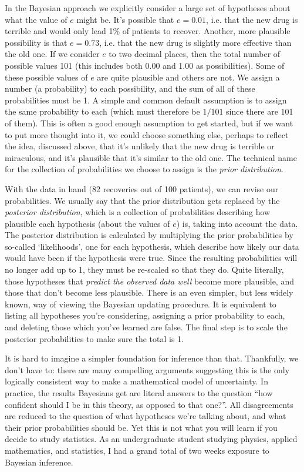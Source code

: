 \documentclass[a4paper, 12pt]{article}
\begin{document}
In the Bayesian approach we explicitly consider a large set of hypotheses about
what the value of $e$ might be. It's possible that $e=0.01$, i.e. that the new
drug is terrible and would only lead 1\% of patients to recover.
Another, more plausible possibility is that $e = 0.73$, i.e.
that the new drug is slightly more effective than the old one. If we
consider $e$ to two decimal places, then the total number of
possible values 101 (this includes both 0.00 and 1.00 as
possibilities).
Some of these possible values of $e$ are
quite plausible and others are not. We assign a number (a probability) to each
possibility, and the sum of all of these probabilities must be 1. A simple and
common default assumption is to assign the same probability to each
(which must therefore be $1/101$ since there are 101 of them).
This is often a good enough assumption to get started, but if we want to put
more thought into it, we could choose something else, perhaps to reflect the
idea, discussed above, that it's unlikely that the new drug is terrible or
miraculous, and it's plausible that it's similar to the old one.
The technical name for the collection of
probabilities we choose to assign is the {\em prior distribution}.

With the data in hand (82 recoveries out of 100 patients), we can revise our probabilities. We usually say that the
prior distribution gets replaced by the {\em posterior distribution}, which
is a collection of probabilities describing how plausible each hypothesis
(about the values of $e$) is, taking into account the data.
The posterior distribution is calculated by multiplying the prior probabilities
by so-called `likelihoods', one for each hypothesis,
which describe how likely our data would have been if the hypothesis were true.
Since the resulting probabilities will no longer add up to 1, they
must be re-scaled so that they do.
Quite literally, those hypotheses that {\it predict the observed data well}
become more plausible, and those that don't become less plausible.
There is an even simpler, but less widely known,
way of viewing the Bayesian updating procedure. It is equivalent to listing
all hypotheses you're considering, assigning a prior probability to each, and
deleting those which you've learned are false. The final step is to scale the
posterior probabilities to make sure the total is 1.

It is hard to imagine a simpler foundation for inference than that. Thankfully,
we don't have to: there are many compelling arguments suggesting this is
the only logically consistent way to make a mathematical model of uncertainty.
In practice, the results Bayesians get are literal answers to the question
``how confident should I be in this theory, as opposed to that one?''. All
disagreements are reduced to the question of what hypotheses we're talking
about, and what their prior probabilities should be.
Yet this is not what you will learn if you decide to study statistics. As an
undergraduate student studying physics, applied mathematics, and statistics,
I had a grand total of two weeks exposure to Bayesian inference.
\end{document}
